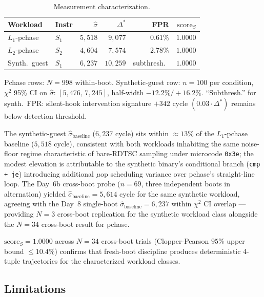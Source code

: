 \documentclass[conference]{IEEEtran}
\newcommand{\sigbase}{\hat{\sigma}_\text{baseline}}
\newcommand{\Dstar}{\Delta^{*}}
\newcommand{\scoreS}{\text{score}_S}
\begin{document}
\begin{table}[tb]
  \caption{Measurement characterization.}
  \label{tab:meas}
  \centering
  \small
  \begin{tabular}{@{}llrrrr@{}}
  \toprule
  Workload      & Instr & $\hat{\sigma}$ & $\Dstar$    & FPR     & $\scoreS$ \\
  \midrule
  $L_1$-pchase  & $S_1$ & $5{,}518$      & $9{,}077$   & $0.61\%$ & $1.0000$ \\
  $L_2$-pchase  & $S_2$ & $4{,}604$      & $7{,}574$   & $2.78\%$ & $1.0000$ \\
  Synth.\ guest & $S_1$ & $6{,}237$      & $10{,}259$  & subthresh.\ & $1.0000$ \\
  \bottomrule
  \end{tabular}

  \vspace{0.3em}
  \footnotesize{Pchase rows: $N{=}998$ within-boot. Synthetic-guest
  row: $n{=}100$ per condition, $\chi^2$ 95\% CI on $\hat{\sigma}$:
  $[5{,}476,\,7{,}245]$, half-width $-12.2\%/+16.2\%$. ``Subthresh.''
  for synth.\ FPR: silent-hook intervention signature $+342$ cycle
  $(0.03\cdot\Dstar)$ remains below detection threshold.}
\end{table}

The synthetic-guest $\sigbase$ ($6{,}237$ cycle) sits within
${\approx}13\%$ of the $L_1$-pchase baseline ($5{,}518$ cycle),
consistent with both workloads inhabiting the same noise-floor
regime characteristic of bare-RDTSC sampling under microcode
\texttt{0x3e}; the modest elevation is attributable to the synthetic
binary's conditional branch (\texttt{cmp + je}) introducing
additional $\mu$op scheduling variance over pchase's straight-line
loop. The Day~6b cross-boot probe ($n{=}69$, three independent boots
in alternation) yielded $\sigbase = 5{,}614$ cycle for the same
synthetic workload, agreeing with the Day~8 single-boot
$\sigbase = 6{,}237$ within $\chi^2$ CI overlap --- providing $N{=}3$
cross-boot replication for the synthetic workload class alongside
the $N{=}34$ cross-boot result for pchase.

$\scoreS = 1.0000$ across $N{=}34$ cross-boot trials (Clopper-Pearson
$95\%$ upper bound $\leq 10.4\%$) confirms that fresh-boot discipline
produces deterministic 4-tuple trajectories for the characterized
workload classes.

\subsection{Limitations}\label{sec:eval-lim}
\end{document}
